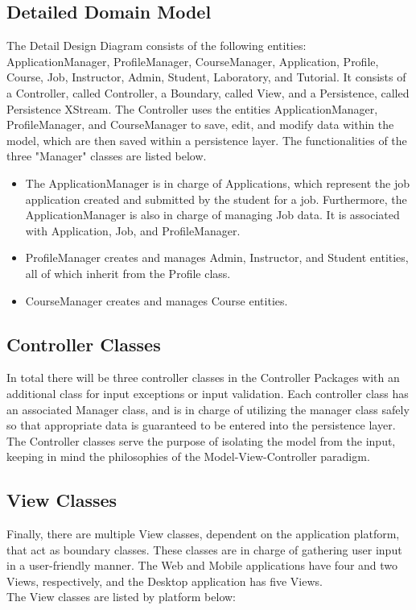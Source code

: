 \documentclass[12pt]{report}
\begin{document}
\subsection{Detailed Domain Model}
The Detail Design Diagram consists of the following entities: ApplicationManager, ProfileManager,
CourseManager, Application, Profile, Course, Job, Instructor, Admin, Student, Laboratory, and
Tutorial. It consists of a Controller, called Controller, a Boundary, called View, and a
Persistence, called Persistence XStream. The Controller uses the entities ApplicationManager,
ProfileManager, and CourseManager to save, edit, and modify data within the model, which are then
saved within a persistence layer. The functionalities of the three "Manager" classes are listed
below.
\begin{itemize}
	\item The ApplicationManager is in charge of Applications, which represent the job application
		created and submitted
		by the student for a job. Furthermore, the ApplicationManager is also in charge of managing
		Job data. It is associated with Application, Job, and ProfileManager.
	\item ProfileManager creates and manages Admin, Instructor, and Student entities, all of which inherit from
		the Profile class.
	\item CourseManager creates and manages Course entities.
\end{itemize}
\subsection{Controller Classes}
In total there will be three controller classes in the Controller Packages with an additional class
for input exceptions or input validation. Each controller class has an associated Manager class, and
is in charge of utilizing the manager class safely so that appropriate data is guaranteed to be
entered into the persistence layer.\\
The Controller classes serve the purpose of isolating the model from the input, keeping in mind the
philosophies of the Model-View-Controller paradigm.
\subsection{View Classes}
Finally, there are multiple View classes, dependent on the application platform, that act as
boundary classes. These classes are in charge of gathering user input in a user-friendly manner. The
Web and Mobile applications have four and two Views, respectively, and the Desktop application has
five Views.\\
The View classes are listed by platform below:
\end{document}
